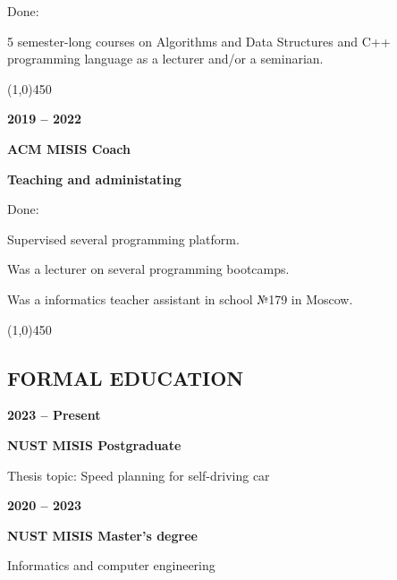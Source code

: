 \documentclass[a4paper,12pt,preview]{report}
\newcommand{\hr}{\begin{center} \line(1,0){450} \end{center}}
\begin{document}
\begin{minipage}[c]{0.15\linewidth}
    Done:
\end{minipage}
\begin{minipage}[c]{0.75\linewidth}
	5 semester-long courses on Algorithms and Data Structures and C++ programming language as a lecturer and/or a seminarian.
\end{minipage}

\hr 

\begin{multicols}{2}
    \textbf{2019 – 2022} 

    \columnbreak

    \textbf{ACM MISIS Coach}

    \textbf{Teaching and administating}
\end{multicols}

\begin{minipage}[c]{0.15\linewidth}
    Done:
\end{minipage}
\begin{minipage}[c]{0.75\linewidth}
	Supervised several programming platform.
	
	Was a lecturer on several programming bootcamps.
	
	Was a informatics teacher assistant in school №179 in Moscow.

\end{minipage}

\hr 

\subsection*{FORMAL EDUCATION}

\begin{minipage}[c]{0.25\linewidth}
    \textbf{2023 – Present}
\end{minipage}
\begin{minipage}[c]{0.65\linewidth}
    \textbf{NUST MISIS Postgraduate}

    Thesis topic: Speed planning for self-driving car
\end{minipage}

\vspace{5mm} %

\begin{minipage}[c]{0.25\linewidth}
    \textbf{2020 – 2023}
\end{minipage}
\begin{minipage}[c]{0.65\linewidth}
    \textbf{NUST MISIS Master's degree}

    Informatics and computer engineering
\end{minipage}
\end{document}
